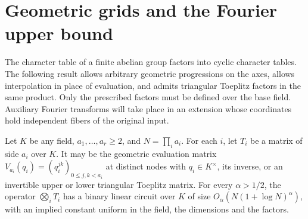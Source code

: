 \section{Geometric grids and the Fourier upper bound}\label{sec:last}

The character table of a finite abelian group factors into cyclic
character tables. The following result allows arbitrary geometric
progressions on the axes, allows interpolation in place of evaluation,
and admits triangular Toeplitz factors in the same product. Only the
prescribed factors must be defined over the base field. Auxiliary
Fourier transforms will take place in an extension whose coordinates
hold independent fibers of the original input.

\begin{theorem}\label{up:grid}\label{up:fourier}
Let \(K\) be any field, \(a_1,\ldots,a_r\ge2\), and \(N=\prod_i a_i\).
For each \(i\), let \(T_i\) be a matrix of side \(a_i\) over \(K\).
It may be the geometric evaluation matrix
\(V_{a_i}(q_i)=(q_i^{jk})_{0\le j,k<a_i}\) at distinct nodes with
\(q_i\in K^\times\), its inverse, or an invertible upper or lower
triangular Toeplitz matrix. For every \(\alpha>1/2\), the operator
\(\bigotimes_i T_i\) has a binary linear circuit over \(K\) of size
\(O_\alpha(N(1+\log N)^\alpha)\), with an implied constant uniform
in the field, the dimensions and the factors.
\end{theorem}


